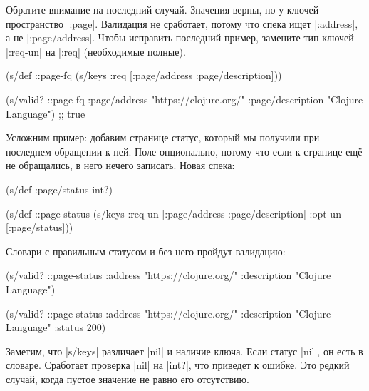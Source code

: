 Обратите внимание на последний случай. Значения верны, но у ключей пространство
\spverb|:page|. Валидация не сработает, потому что спека ищет \spverb|:address|,
а не \spverb|:page/address|. Чтобы исправить последний пример, замените тип
ключей \spverb|:req-un| на \spverb|:req| (необходимые полные).


\begin{english}
  \begin{clojure}
(s/def ::page-fq
  (s/keys :req [:page/address
                :page/description]))

(s/valid? ::page-fq
          {:page/address "https://clojure.org/"
           :page/description "Clojure Language"})
;; true
  \end{clojure}
\end{english}

Усложним пример: добавим странице статус, который мы получили при
последнем обращении к ней. Поле опционально, потому что если к странице ещ\"{е} не
обращались, в него нечего записать. Новая спека:

\begin{english}
  \begin{clojure}
(s/def :page/status int?)

(s/def ::page-status
  (s/keys :req-un [:page/address
                   :page/description]
          :opt-un [:page/status]))
  \end{clojure}
\end{english}

\noindent
Словари с правильным статусом и без него пройдут валидацию:

\begin{english}
  \begin{clojure}
(s/valid? ::page-status
          {:address "https://clojure.org/"
           :description "Clojure Language"})

(s/valid? ::page-status
          {:address "https://clojure.org/"
           :description "Clojure Language"
           :status 200})
  \end{clojure}
\end{english}


Заметим, что \spverb|s/keys| различает \spverb|nil| и наличие ключа. Если статус
\spverb|nil|, он есть в словаре. Сработает проверка \spverb|nil| на
\spverb|int?|, что приведет к ошибке. Это редкий случай, когда пустое значение
не равно его отсутствию.

